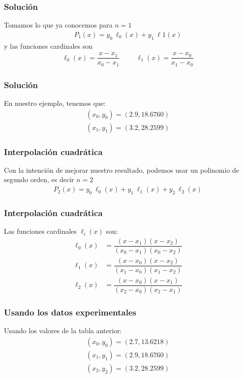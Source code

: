 \begin{frame}[fragile]
\frametitle{Solución}
Tomamos lo que ya conocemos para $n=1$
\begin{align*}
P_{1}(x) = y_{0} \: \ell_{0}(x) + y_{1} \: \ell{1}(x)
\end{align*}
\pause
y las funciones cardinales son
\begin{align*}
\ell_{0}(x) = \dfrac{x - x_{1}}{x_{0} - x_{1}} \hspace{1cm} \ell_{1}(x) = \dfrac{x - x_{0}}{x_{1} - x_{0}}
\end{align*}
\end{frame}
\begin{frame}[fragile]
\frametitle{Solución}
En nuestro ejemplo, tenemos que:
\begin{align*}
(x_{0}, y_{0}) = (2.9, 18.6760) \\[1em]
(x_{1}, y_{1}) = (3.2, 28.2599)
\end{align*}
\end{frame}
\begin{frame}
\frametitle{Interpolación cuadrática}
Con la intención de mejorar nuestro resultado, podemos usar un polinomio de segundo orden, es decir $n = 2$
\begin{align*}
P_{2}(x) = y_{0} \: \ell_{0}(x) + y_{1} \: \ell_{1}(x) + y_{2} \: \ell_{2}(x)
\end{align*}
\end{frame}
\begin{frame}
\frametitle{Interpolación cuadrática}
Las funciones cardinales $\ell_{i}(x)$ son:
\begin{align*}
\ell_{0}(x) &= \dfrac{(x - x_{1})(x - x_{2})}{(x_{0} - x_{1})(x_{0} - x_{2})} \\[1em]
\ell_{1}(x) &= \dfrac{(x - x_{0})(x - x_{2})}{(x_{1} - x_{0})(x_{1} - x_{2})} \\[1em]
\ell_{2}(x) &= \dfrac{(x - x_{0})(x - x_{1})}{(x_{2} - x_{0})(x_{2} - x_{1})} 
\end{align*}
\end{frame}
\begin{frame}
\frametitle{Usando los datos experimentales}
Usando los valores de la tabla anterior:
\begin{eqnarray*}
(x_{0}, y_{0}) = (2.7, 13.6218) \\
(x_{1}, y_{1}) = (2.9, 18.6760) \\
(x_{2}, y_{2}) = (3.2, 28.2599)
\end{eqnarray*}
\\
\bigskip
{}
\end{frame}
